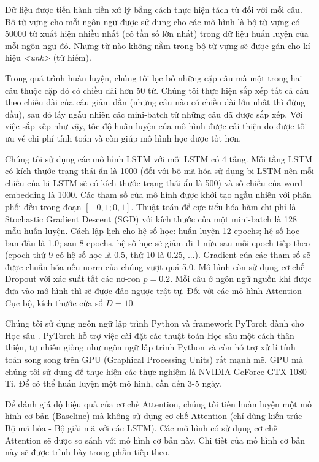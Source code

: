 Dữ liệu được tiến hành tiền xử lý bằng cách thực hiện tách từ đối với mỗi câu. Bộ từ vựng cho mỗi ngôn ngữ được sử dụng cho các mô hình là bộ từ vựng có 50000 từ xuất hiện nhiều nhất (có tần số lớn nhất) trong dữ liệu huấn luyện của mỗi ngôn ngữ đó. Những từ nào không nằm trong bộ từ vựng sẽ được gán cho kí hiệu \textit{<unk>} (từ hiếm).

Trong quá trình huấn luyện, chúng tôi lọc bỏ những cặp câu mà một trong hai câu thuộc cặp đó có chiều dài hơn 50 từ. Chúng tôi thực hiện sắp xếp tất cả câu theo chiều dài của câu giảm dần (những câu nào có chiều dài lớn nhất thì đứng đầu), sau đó lấy ngẫu nhiên các mini-batch từ những câu đã được sắp xếp. Với việc sắp xếp như vậy, tốc độ huấn luyện của mô hình được cải thiện do được tối ưu về chi phí tính toán và còn giúp mô hình học được tốt hơn.

Chúng tôi sử dụng các mô hình LSTM với mỗi LSTM có 4 tầng. Mỗi tầng LSTM có kích thước trạng thái ẩn là 1000 (đối với bộ mã hóa sử dụng bi-LSTM nên mỗi chiều của bi-LSTM sẽ có kích thước trạng thái ẩn là 500) và số chiều của word embedding là 1000. Các tham số của mô hình được khởi tạo ngẫu nhiên với phân phối đều trong đoạn $[-0,1; 0,1]$. Thuật toán để cực tiểu hóa hàm chi phí là Stochastic Gradient Descent (SGD) với kích thước của một mini-batch là 128 mẫu huấn luyện. Cách lập lịch cho hệ số học: huấn luyện 12 epochs; hệ số học ban đầu là 1.0; sau 8 epochs, hệ số học sẽ giảm đi 1 nửa sau mỗi epoch tiếp theo (epoch thứ 9 có hệ số học là 0.5, thứ 10 là 0.25, ...). Gradient của các tham số sẽ được chuẩn hóa nếu norm của chúng vượt quá 5.0. Mô hình còn sử dụng cơ chế Dropout với xác suất tắt các nơ-ron $p = 0.2$. Mỗi câu ở ngôn ngữ nguồn khi được đưa vào mô hình thì sẽ được đảo ngược trật tự. Đối với các mô hình Attention Cục bộ, kích thước cửa sổ $D = 10$.

Chúng tôi sử dụng ngôn ngữ lập trình Python và framework PyTorch dành cho Học sâu \cite{pytorchworkshop}. PyTorch hỗ trợ việc cài đặt các thuật toán Học sâu một cách thân thiện, tự nhiên giống như ngôn ngữ lâp trình Python và còn hỗ trợ xử lí tính toán song song trên GPU (Graphical Processing Units) rất mạnh mẽ. GPU mà chúng tôi sử dụng để thực hiện các thực nghiệm là NVIDIA GeForce GTX 1080 Ti. Để có thể huấn luyện một mô hình, cần đến 3-5 ngày.

Để đánh giá độ hiệu quả của cơ chế Attention, chúng tôi tiến huấn luyện một mô hình cơ bản (Baseline) mà không sử dụng cơ chế Attention (chỉ dùng kiến trúc Bộ mã hóa - Bộ giải mã với các LSTM). Các mô hình có sử dụng cơ chế Attention sẽ được so sánh với mô hình cơ bản này. Chi tiết của mô hình cơ bản này sẽ được trình bày trong phần tiếp theo.

